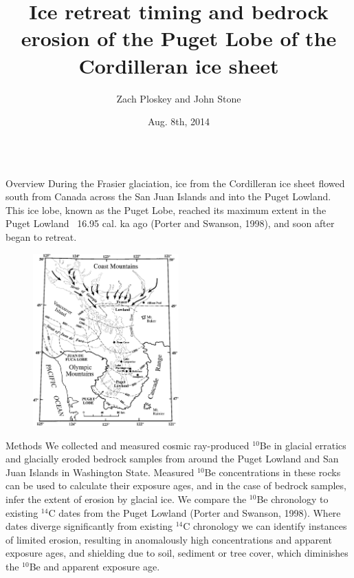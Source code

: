 \documentclass{beamer}
\title{Ice retreat timing and bedrock erosion of the Puget Lobe of the Cordilleran ice sheet}
\author{Zach Ploskey and John Stone}
\institute{Cosmogenic Nuclide Lab, Dept. of Earth and Space Sciences, University of Washington, Seattle}
\date{Aug. 8th, 2014}
\begin{document}
\begin{frame}{}\centering

\begin{columns}[T]

\begin{column}{0.32\columnwidth}

\begin{block}{Overview}	
During the Frasier glaciation, ice from the Cordilleran ice sheet flowed south from Canada across the San Juan Islands and into the Puget Lowland.
This ice lobe, known as the Puget Lobe, reached its maximum extent in the Puget Lowland ~16.95 cal. ka ago  (Porter and Swanson, 1998), and soon after began to retreat.

\begin{figure}
\includegraphics[width=0.5\textwidth]{lobe_map.png}
\end{figure}

\end{block}

\begin{block}{Methods}
We collected and measured cosmic ray-produced $^{10}$Be in glacial erratics and glacially eroded bedrock samples from around the Puget Lowland and San Juan Islands in Washington State.
Measured $^{10}$Be concentrations in these rocks can be used to calculate their exposure ages, and in the case of bedrock samples, infer the extent of erosion by glacial ice.
We compare the $^{10}$Be chronology to existing $^{14}$C dates from the Puget Lowland (Porter and Swanson, 1998).
Where dates diverge significantly from existing $^{14}$C chronology we can identify instances of limited erosion, resulting in anomalously high concentrations and apparent exposure ages, and shielding due to soil, sediment or tree cover, which diminishes the $^{10}$Be and apparent exposure age.
\end{block}


\end{column}
\end{columns}
\end{frame}
\end{document}
